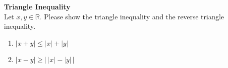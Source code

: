 \textbf{Triangle Inequality}\\
Let $x,y \in \mathbb{R}$.
Please show the triangle inequality and the reverse triangle inequality.
\begin{enumerate}
	\item $|x+y| \leq |x|+|y|$
	\item $|x-y| \geq \left|\, |x| - |y|\,\right|$
\end{enumerate}